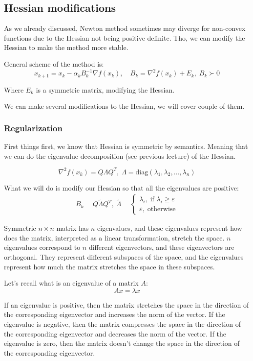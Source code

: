 \subsection{Hessian modifications}

As we already discussed, Newton method sometimes may diverge for non-convex functions due to the Hessian not being positive definite. Tho, we can modify the Hessian to make the method more stable.

General scheme of the method is:
\[
    x_{k+1} = x_k - \alpha_k B^{-1}_k \nabla f(x_k), \quad B_k = \nabla^2 f(x_k) + E_k, \; B_k \succ 0
\]

Where $E_k$ is a symmetric matrix, modifying the Hessian.

We can make several modifications to the Hessian, we will cover couple of them. 

\subsubsection{Regularization}

First things first, we know that Hessian is symmetric by semantics. Meaning that we can do the eigenvalue decomposition (see previous lecture) of the Hessian.

\[ 
    \nabla^2 f(x_k) = Q \Lambda Q^T, \; \Lambda = \text{diag}(\lambda_1, \lambda_2, \dots, \lambda_n)
\] 


What we will do is modify our Hessian so that all the eigenvalues are positive: 
\begin{gather*}
    B_k = Q \tilde{\Lambda} Q^T, \; \tilde{\Lambda} = \begin{cases}
        \lambda_i, \; \text{if } \lambda_i \geqslant \varepsilon \\
        \varepsilon, \; \text{otherwise}
    \end{cases}
\end{gather*}

Symmetric $n \times n$ matrix has $n$ eigenvalues, and these eigenvalues represent how does the matrix, interpreted as a linear transformation, stretch the space. $n$ eigenvalues correspond to $n$ different eigenvectors, and these eigenvectors are orthogonal. They represent different subspaces of the space, and the eigenvalues represent how much the matrix stretches the space in these subspaces.

Let's recall what is an eigenvalue of a matrix $A$: 
\[ 
    A x = \lambda x
\]

If an eigenvalue is positive, then the matrix stretches the space in the direction of the corresponding eigenvector and increases the norm of the vector. If the eigenvalue is negative, then the matrix compresses the space in the direction of the corresponding eigenvector and decreases the norm of the vector. If the eigenvalue is zero, then the matrix doesn't change the space in the direction of the corresponding eigenvector.

